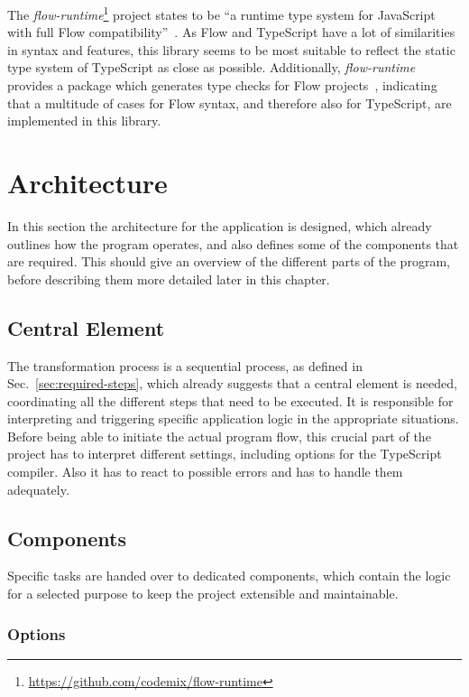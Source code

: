 The \emph{flow-runtime}\footnote{\url{https://github.com/codemix/flow-runtime}} project states to be ``a runtime type system for JavaScript with full Flow compatibility''~\cite{RuntimeTypeSystem:flow-runtime:lib}. As Flow and TypeScript have a lot of similarities in syntax and features, this library seems to be most suitable to reflect the static type system of TypeScript as close as possible. Additionally, \emph{flow-runtime} provides a package which generates type checks for Flow projects~\cite{RuntimeTypeSystem:flow-runtime:babel}, indicating that a multitude of cases for Flow syntax, and therefore also for TypeScript, are implemented in this library.

\section{Architecture}
\label{sec:architecture}

In this section the architecture for the application is designed, which already outlines how the program operates, and also defines some of the components that are required. This should give an overview of the different parts of the program, before describing them more detailed later in this chapter.

\subsection{Central Element}

The transformation process is a sequential process, as defined in Sec.~\ref{sec:required-steps}, which already suggests that a central element is needed, coordinating all the different steps that need to be executed. It is responsible for interpreting and triggering specific application logic in the appropriate situations. Before being able to initiate the actual program flow, this crucial part of the project has to interpret different settings, including options for the TypeScript compiler. Also it has to react to possible errors and has to handle them adequately.

\subsection{Components}

Specific tasks are handed over to dedicated components, which contain the logic for a selected purpose to keep the project extensible and maintainable.

\subsubsection{Options}

